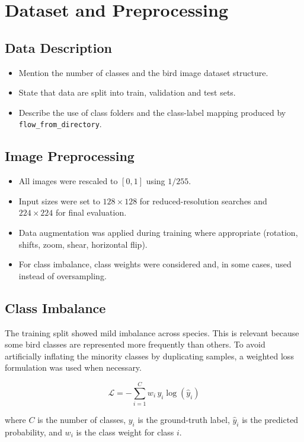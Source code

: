 \documentclass[11pt, a4paper]{report}
\begin{document}
\chapter{Dataset and Preprocessing}
\section{Data Description}
\begin{itemize}[leftmargin=1.5em]
    \item Mention the number of classes and the bird image dataset structure.
    \item State that data are split into train, validation and test sets.
    \item Describe the use of class folders and the class-label mapping produced by \texttt{flow\_from\_directory}.
\end{itemize}

\section{Image Preprocessing}
\begin{itemize}[leftmargin=1.5em]
    \item All images were rescaled to $[0,1]$ using $1/255$.
    \item Input sizes were set to $128 \times 128$ for reduced-resolution searches and $224 \times 224$ for final evaluation.
    \item Data augmentation was applied during training where appropriate (rotation, shifts, zoom, shear, horizontal flip).
    \item For class imbalance, class weights were considered and, in some cases, used instead of oversampling.
\end{itemize}

\section{Class Imbalance}
The training split showed mild imbalance across species. This is relevant because some bird classes are represented more frequently than others. To avoid artificially inflating the minority classes by duplicating samples, a weighted loss formulation was used when necessary.

\begin{equation}
\mathcal{L} = -\sum_{i=1}^{C} w_i \, y_i \log(\hat{y}_i)
\end{equation}

where $C$ is the number of classes, $y_i$ is the ground-truth label, $\hat{y}_i$ is the predicted probability, and $w_i$ is the class weight for class $i$.
\end{document}
